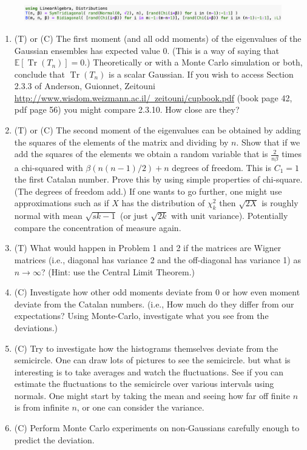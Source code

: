 \documentclass{article}
\DeclareMathOperator{\Tr}{Tr}
\begin{document}
\begin{figure}[h]
    \centering
    \includegraphics[width=6in]{code1.png}
\end{figure}

\begin{enumerate}
    \item (T) or (C) The first moment (and all odd moments) of the eigenvalues of the Gaussian ensembles has expected value 0. (This is a way of saying that $\mathbb{E}[\Tr(T_n)]=0$.) Theoretically or with a Monte Carlo simulation or both, conclude that $\Tr(T_n)$ is a scalar Gaussian. If you wish to access  Section 2.3.3 of Anderson, Guionnet, Zeitouni  \href{http://www.wisdom.weizmann.ac.il/~zeitouni/cupbook.pdf}{http://www.wisdom.weizmann.ac.il/~zeitouni/cupbook.pdf} (book page 42, pdf page 56) you might compare 2.3.10. How close are they?
    \item (T) or (C) The second moment of the eigenvalues can be obtained by adding the squares of the elements of the matrix and dividing by $n$.  Show that if we add the squares of the elements we obtain a random variable that is $\frac{2}{n\beta}$ times a chi-squared with
    $\beta(n(n-1)/2)+n$ degrees of freedom.   This is $C_1=1$ the first Catalan number.
Prove this by using simple properties of chi-square. (The degrees of freedom add.)  
If one wants to go further, one might use approximations such as if $X$ has the distribution of $\chi_k^2$ then $\sqrt{2X}$ is roughly normal with mean $\sqrt{sk-1}$ (or just $\sqrt{2k}$ with unit variance). Potentially compare the concentration of measure again.
    \item (T) What would happen in Problem 1 and 2 if the matrices are Wigner matrices (i.e., diagonal has variance 2 and the off-diagonal has variance 1) as $n\to \infty$? (Hint: use the Central Limit Theorem.)
    \item (C) Investigate how other odd moments deviate from 0 or how even moment deviate from the Catalan numbers. (i.e., How much do they differ from our expectations? Using Monte-Carlo, investigate what you see from the deviations.)
    \item (C) Try to investigate how the histograms themselves deviate from the semicircle. One can draw lots of pictures to see the semicircle. but what is interesting is to take averages and watch the fluctuations. See if you can estimate the fluctuations to the semicircle over various intervals using normals. One might start by taking the mean and seeing how far off finite $n$ is from infinite $n$, or one can consider the variance.
    \item (C) Perform Monte Carlo experiments on non-Gaussians carefully enough to predict the deviation.
\end{enumerate}
\end{document}
